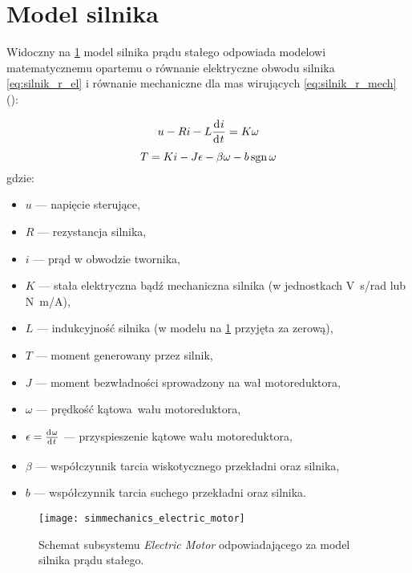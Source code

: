 \section{Model silnika}
\label{sec:ch4_model_silnika}

Widoczny na \cref{fig:sm_electric_motor} model silnika prądu stałego odpowiada modelowi matematycznemu opartemu o równanie elektryczne obwodu silnika \eqref{eq:silnik_r_el} i równanie mechaniczne dla mas wirujących \eqref{eq:silnik_r_mech} (\cite{SILNIKIEL}):

\begin{equation}\label{eq:silnik_r_el}
    u - R i - L \deriv{i}{t} = K \omega 
\end{equation}
\begin{equation}\label{eq:silnik_r_mech}
    T = K i - J \epsilon - \beta \omega - b \operatorname{sgn} \omega
\end{equation}
gdzie:
\begin{itemize}
    \item $u$ --- napięcie sterujące,
    \item $R$ --- rezystancja silnika,
    \item $i$ --- prąd w obwodzie twornika,
    \item $K$ --- stała elektryczna bądź mechaniczna silnika (w jednostkach \si[per-mode=symbol]{\volt\second\per\radian} lub \si[per-mode=symbol]{\newton\meter\per\ampere}),
    \item $L$ --- indukcyjność silnika (w modelu na \cref{fig:sm_electric_motor} przyjęta za zerową),
    \item $T$ --- moment generowany przez silnik,
    \item $J$ --- moment bezwładności sprowadzony na wał motoreduktora,
    \item $\omega$ --- prędkość kątowa wału motoreduktora,
    \item $\epsilon = \deriv{\omega}{t}$ --- przyspieszenie kątowe wału motoreduktora,
    \item $\beta$ --- współczynnik tarcia wiskotycznego przekładni oraz silnika,
    \item $b$ --- współczynnik tarcia suchego przekładni oraz silnika.
\end{itemize}

\begin{figure}[h]
    \centering
    \texttt{[image: simmechanics\_electric\_motor]}
    \caption{Schemat subsystemu \textit{Electric Motor} odpowiadającego za model silnika prądu stałego.}
    \label{fig:sm_electric_motor}
\end{figure}

